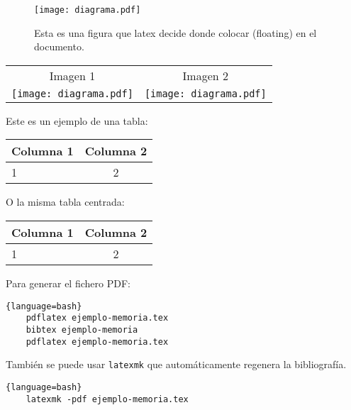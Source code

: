   \begin{figure}[!htb]
    \texttt{[image: diagrama.pdf]}
    \caption{Esta es una figura que latex decide donde colocar (floating) en el documento.}
    \label{fig:diagrama}
    \end{figure}

  \begin{tabular}{cc}
    Imagen 1 & Imagen 2 \\[2mm]
    \texttt{[image: diagrama.pdf]} &  \texttt{[image: diagrama.pdf]}
  \end{tabular}

  Este es un ejemplo de una tabla:

  \begin{tabular}{|l|c|}
    \hline
    Columna 1 & Columna 2 \\ \hline
    1 & 2 \\ \hline
  \end{tabular}


  \vspace*{1cm}
  O la misma tabla centrada:

  \begin{center}
    \begin{tabular}{|l|c|}
      \hline
      Columna 1 & Columna 2 \\ \hline
      1 & 2 \\ \hline
    \end{tabular}
  \end{center}

  Para generar el fichero PDF:

  \begin{lstlisting}{language=bash}
    pdflatex ejemplo-memoria.tex
    bibtex ejemplo-memoria
    pdflatex ejemplo-memoria.tex
\end{lstlisting}

  También se puede usar \texttt{latexmk} que automáticamente regenera la bibliografía.
  \begin{lstlisting}{language=bash}
    latexmk -pdf ejemplo-memoria.tex
\end{lstlisting}

